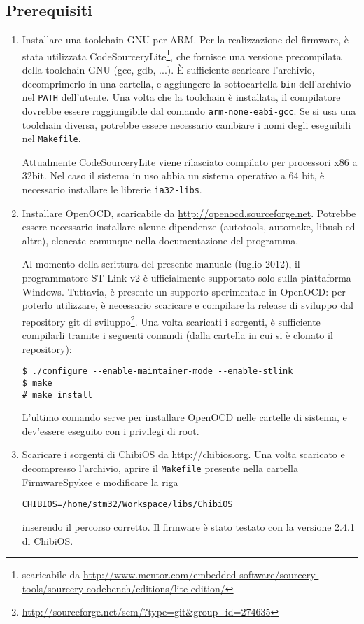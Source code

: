 \subsection*{Prerequisiti}
\begin{enumerate}
\item Installare una toolchain GNU per ARM. Per la realizzazione del firmware, è stata utilizzata  CodeSourceryLite\footnote{scaricabile da \url{http://www.mentor.com/embedded-software/sourcery-tools/sourcery-codebench/editions/lite-edition/}}, che fornisce una versione precompilata della toolchain GNU (gcc, gdb, ...). È sufficiente scaricare l'archivio, decomprimerlo in una cartella, e aggiungere la sottocartella \verb|bin| dell'archivio nel \verb|PATH| dell’utente. Una volta che la toolchain è installata, il compilatore dovrebbe essere raggiungibile dal comando \verb|arm-none-eabi-gcc|. Se si usa una toolchain diversa, potrebbe essere necessario cambiare i nomi degli eseguibili nel \verb|Makefile|.

\begin{nota}
Attualmente CodeSourceryLite viene rilasciato compilato per processori x86 a 32bit. Nel caso il sistema in uso abbia un sistema operativo a 64 bit, è necessario installare le librerie \verb|ia32-libs|.
\end{nota}

\item Installare OpenOCD, scaricabile da \url{http://openocd.sourceforge.net}. Potrebbe essere necessario installare alcune dipendenze (autotools, automake, libusb ed altre), elencate comunque nella documentazione del programma.

\begin{nota}
Al momento della scrittura del presente manuale (luglio 2012), il programmatore ST-Link v2 è ufficialmente supportato solo sulla piattaforma Windows. Tuttavia, è presente un supporto sperimentale in OpenOCD: per poterlo utilizzare, è necessario scaricare e compilare la release di sviluppo dal repository git di sviluppo\footnote{\url{http://sourceforge.net/scm/?type=git&group_id=274635}}. Una volta scaricati i sorgenti, è sufficiente compilarli tramite i seguenti comandi  (dalla cartella in cui si è clonato il repository):
\begin{verbatim}
$ ./configure --enable-maintainer-mode --enable-stlink
$ make
# make install
\end{verbatim}
L'ultimo comando serve per installare OpenOCD nelle cartelle di sistema, e dev'essere eseguito con i privilegi di root.
\end{nota}

\item Scaricare i sorgenti di ChibiOS da \url{http://chibios.org}. Una volta scaricato e decompresso l'archivio, aprire il \verb|Makefile| presente nella cartella FirmwareSpykee e modificare la riga
\begin{verbatim}
CHIBIOS=/home/stm32/Workspace/libs/ChibiOS
\end{verbatim}
inserendo il percorso corretto. Il firmware è stato testato con la versione 2.4.1 di ChibiOS.
\end{enumerate}

